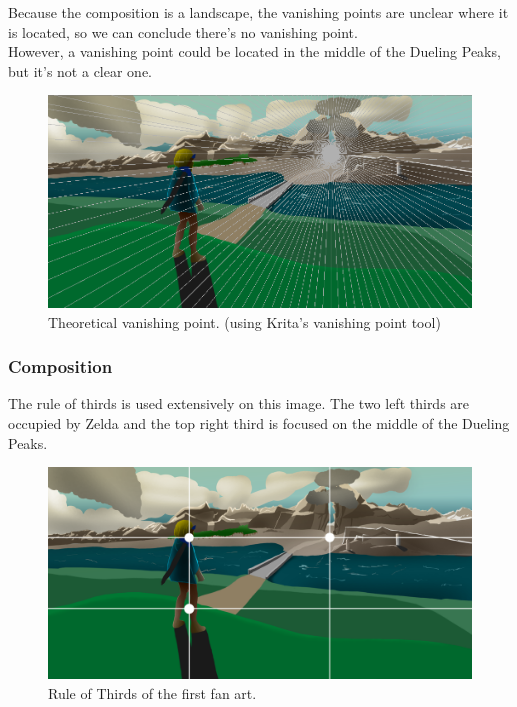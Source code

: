 \documentclass{cup-pan}
\begin{document}
            Because the composition is a landscape, the vanishing points are unclear where it is located, so we can conclude there's no vanishing point.\\
            However, a vanishing point could be located in the middle of the Dueling Peaks, but it's not a clear one.\\
            \begin{figure}[H]
                \includegraphics[width=\textwidth]{Imagenes/Fanart1/Analysis/puntofuga.png}
                \caption{Theoretical vanishing point. (using Krita's vanishing point tool)}
            \end{figure}

        \subsubsection{Composition}

            The rule of thirds is used extensively on this image. The two left thirds are occupied by Zelda and the top right third is focused on the middle of the Dueling Peaks.\\
            \begin{figure}[H]
                \includegraphics[width=\textwidth]{Imagenes/Fanart1/Analysis/reglatercios.png}
                \caption{Rule of Thirds of the first fan art.}
            \end{figure}
\end{document}

